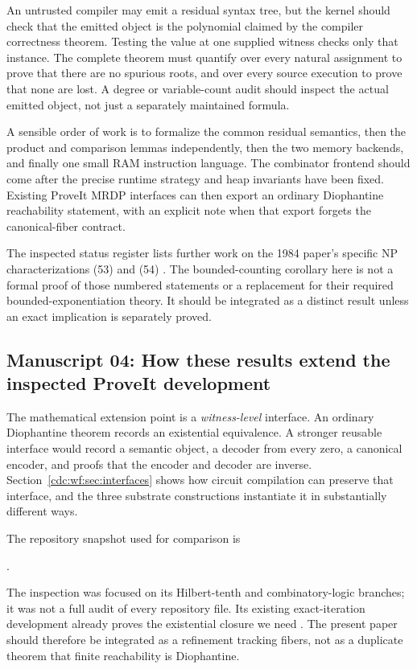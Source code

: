 \documentclass[11pt,a4paper]{article}
\theoremstyle{definition}
\theoremstyle{remark}
\begin{document}
An untrusted compiler may emit a residual syntax tree, but the kernel should
check that the emitted object is the polynomial claimed by the compiler
correctness theorem. Testing the value at one supplied witness checks only
that instance. The complete theorem must quantify over every natural assignment
to prove that there are no spurious roots, and over every source execution to
prove that none are lost. A degree or variable-count audit should inspect the
actual emitted object, not just a separately maintained formula.

A sensible order of work is to formalize the common residual semantics, then
the product and comparison lemmas independently, then the two memory backends,
and finally one small RAM instruction language. The combinator frontend should
come after the precise runtime strategy and heap invariants have been fixed.
Existing ProveIt MRDP interfaces can then export an ordinary Diophantine
reachability statement, with an explicit note when that export forgets the
canonical-fiber contract.

The inspected status register lists further work on the 1984 paper's specific
NP characterizations (53) and (54) \cite{repo-status}. The bounded-counting
corollary here is not a formal proof of those numbered statements or a
replacement for their required bounded-exponentiation theory. It should be
integrated as a distinct result unless an exact implication is separately
proved.


\subsection{Manuscript 04: How these results extend the inspected ProveIt development}
The mathematical extension point is a \emph{witness-level} interface. An ordinary Diophantine theorem records an existential equivalence. A stronger reusable interface would record a semantic object, a decoder from every zero, a canonical encoder, and proofs that the encoder and decoder are inverse. Section~\ref{cdc:wf:sec:interfaces} shows how circuit compilation can preserve that interface, and the three substrate constructions instantiate it in substantially different ways.

The repository snapshot used for comparison is
\begin{center}\small{}.\end{center}
The inspection was focused on its Hilbert-tenth and combinatory-logic branches; it was not a full audit of every repository file. Its existing exact-iteration development already proves the existential closure we need \cite{repo-trace}. The present paper should therefore be integrated as a refinement tracking fibers, not as a duplicate theorem that finite reachability is Diophantine.
\end{document}

